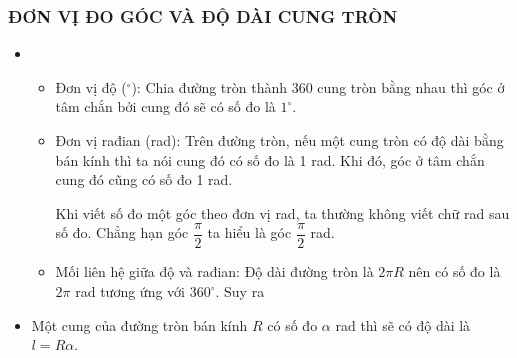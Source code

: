 \subsubsection{ĐƠN VỊ ĐO GÓC VÀ ĐỘ DÀI CUNG TRÒN}
\begin{itemize}
	\item[\iconMT] 
	\begin{itemize}
		\item Đơn vị độ ($^\circ$): Chia đường tròn thành 360 cung tròn bằng nhau thì góc ở tâm chắn bởi cung đó sẽ có số đo là $1^\circ$.
		\item Đơn vị rađian (rad): Trên đường tròn, nếu một cung tròn có độ dài bằng bán kính thì ta nói cung đó có số đo là 1 rad. Khi đó, góc ở tâm chắn cung đó cũng có số đo 1 rad.
		\begin{luuy}
			Khi viết số đo một góc theo đơn vị rad, ta thường không viết chữ rad sau số đo. Chẳng hạn góc $\dfrac{\pi}{2}$ ta hiểu là góc $\dfrac{\pi}{2}$ rad.
		\end{luuy}
		\item Mối liên hệ giữa độ và rađian: Độ dài đường tròn là $2\pi R$ nên có số đo là $2 \pi$ rad tương ứng với $360^\circ$. Suy ra
	\end{itemize}
	\item[\iconMT]  Một cung của đường tròn bán kính $R$ có số đo $\alpha$ rad thì sẽ có độ dài là $l=R\alpha$.
\end{itemize}

